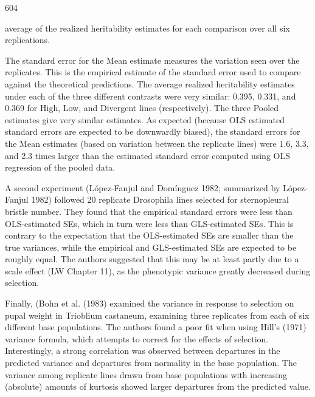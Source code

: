 \documentclass{article}
\begin{document}
604

average of the realized heritability estimates for each comparison over all six replications.

The standard error for the Mean estimate measures the variation seen over the replicates. This is the empirical estimate of the standard error used to compare against the theoretical predictions. The average realized heritability estimates under each of the three different contrasts were very similar: 0.395, 0.331, and 0.369 for High, Low, and Divergent lines (respectively). The three Pooled estimates give very similar estimates. As expected (because OLS estimated standard errors are expected to be downwardly biased), the standard errors for the Mean estimates (based on variation between the replicate lines) were 1.6, 3.3, and 2.3 times larger than the estimated standard error computed using OLS regression of the pooled data.

A second experiment (López-Fanjul and Domínguez 1982; summarized by López-Fanjul 1982) followed 20 replicate Drosophila lines selected for sternopleural bristle number. They found that the empirical standard errors were less than OLS-estimated SEs, which in turn were less than GLS-estimated SEs. This is contrary to the expectation that the OLS-estimated SEs are smaller than the true variances, while the empirical and GLS-estimated SEs are expected to be roughly equal. The authors suggested that this may be at least partly due to a scale effect (LW Chapter 11), as the phenotypic variance greatly decreased during selection.

Finally, (Bohn et al. (1983) examined the variance in response to selection on pupal weight in Trioblium castaneum, examining three replicates from each of six different base populations. The authors found a poor fit when using Hill's (1971) variance formula, which attempts to correct for the effects of selection. Interestingly, a strong correlation was observed between departures in the predicted variance and departures from normality in the base population. The variance among replicate lines drawn from base populations with increasing (absolute) amounts of kurtosis showed larger departures from the predicted value.
\end{document}
